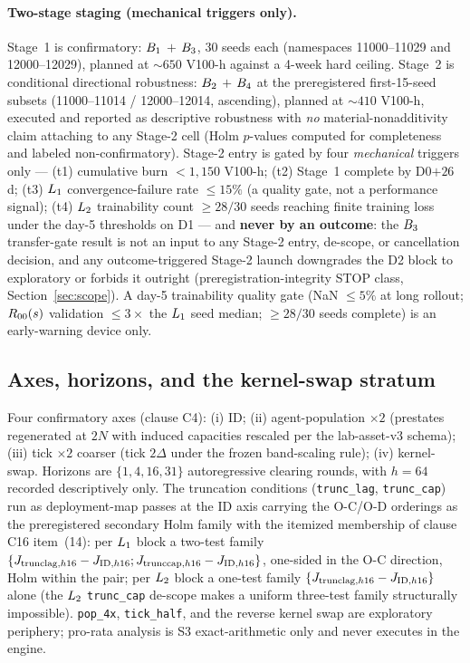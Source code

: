 \paragraph{Two-stage staging (mechanical triggers only).}
Stage~1 is confirmatory: $B_{1}$ $+$ $B_{3}$, 30 seeds each
(namespaces 11000--11029 and 12000--12029), planned at ${\sim}650$ V100-h
against a 4-week hard ceiling. Stage~2 is conditional directional robustness:
$B_{2}$ $+$ $B_{4}$ at the preregistered first-15-seed subsets
(11000--11014 / 12000--12014, ascending), planned at ${\sim}410$ V100-h,
executed and reported as descriptive robustness with \emph{no}
material-nonadditivity claim attaching to any Stage-2 cell (Holm $p$-values
computed for completeness and labeled non-confirmatory). Stage-2 entry is
gated by four \emph{mechanical} triggers only --- (t1) cumulative burn
$< 1{,}150$ V100-h; (t2) Stage~1 complete by D0$+26$d; (t3) $L_{1}$
convergence-failure rate $\le 15\%$ (a quality gate, not a performance
signal); (t4) $L_{2}$ trainability count $\ge 28/30$ seeds reaching finite
training loss under the day-5 thresholds on D1 --- and \textbf{never by an
outcome}: the $B_{3}$ transfer-gate result is not an input to any Stage-2
entry, de-scope, or cancellation decision, and any outcome-triggered Stage-2
launch downgrades the D2 block to exploratory or forbids it outright
(preregistration-integrity STOP class, Section~\ref{sec:scope}). A day-5
trainability quality gate (NaN $\le 5\%$ at long rollout; $R_{00}(s)$
validation $\le 3\times$ the $L_{1}$ seed median; $\ge 28/30$ seeds complete)
is an early-warning device only.

\subsection{Axes, horizons, and the kernel-swap stratum}
\label{sec:cube-axes}

Four confirmatory axes (clause C4): (i) ID; (ii) agent-population $\times 2$
(prestates regenerated at $2N$ with induced capacities rescaled per the
lab-asset-v3 schema); (iii) tick $\times 2$ coarser (tick $2\Delta$ under the
frozen band-scaling rule); (iv) kernel-swap. Horizons are $\{1,4,16,31\}$
autoregressive clearing rounds, with $h=64$ recorded descriptively only. The
truncation conditions (\texttt{trunc\_lag}, \texttt{trunc\_cap}) run as
deployment-map passes at the ID axis carrying the O-C/O-D orderings as the
preregistered secondary Holm family with the itemized membership of clause
C16 item~(14): per $L_{1}$ block a two-test family
$\{J_{\mathrm{trunclag},h16} - J_{\mathrm{ID},h16};
J_{\mathrm{trunccap},h16} - J_{\mathrm{ID},h16}\}$, one-sided in the
O-C direction, Holm within the pair; per $L_{2}$ block a one-test family
$\{J_{\mathrm{trunclag},h16} - J_{\mathrm{ID},h16}\}$ alone (the
$L_{2}$ \texttt{trunc\_cap} de-scope makes a uniform three-test family
structurally impossible). \texttt{pop\_4x}, \texttt{tick\_half}, and the
reverse kernel swap are exploratory periphery; pro-rata analysis is S3
exact-arithmetic only and never executes in the engine.


